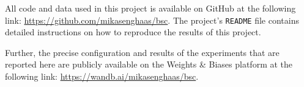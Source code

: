 \documentclass{article}
\begin{document}
  All code and data used in this project is available on GitHub at the
  following link: \url{https://github.com/mikasenghaas/bsc}. The project's 
  \texttt{README} file contains detailed instructions on how to reproduce the
  results of this project.

  Further, the precise configuration and results of the experiments that are
  reported here are publicly available on the Weights \& Biases platform at the
  following link: \url{https://wandb.ai/mikasenghaas/bsc}.


  \newpage
  
  
\end{document}
